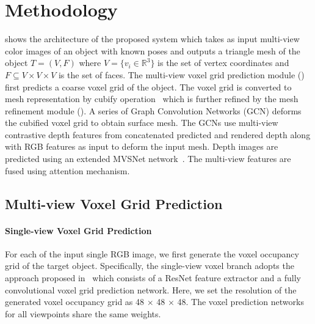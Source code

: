 \section{Methodology}
 shows the architecture of the proposed system which takes as input multi-view color images of an object with known poses and outputs a triangle mesh of the object $ T = (V, F) $ where $ V = \{ v_i \in \mathbb{R}^3\} $ is the set of vertex coordinates and $ F \subseteq V \times V \times V $ is the set of faces.
The multi-view voxel grid prediction module () first predicts a coarse voxel grid of the object.
The voxel grid is converted to mesh representation by cubify operation~\cite{gkioxari2019meshrcnn} which is further refined by the mesh refinement module ().
A series of Graph Convolution Networks (GCN) deforms the cubified voxel grid to obtain surface mesh.
The GCNs use multi-view contrastive depth features from concatenated predicted and rendered depth along with RGB features as input to deform the input mesh.
Depth images are predicted using an extended MVSNet network~\cite{yao2018mvsnet}.
The multi-view features are fused using attention mechanism.

\subsection{Multi-view Voxel Grid Prediction}
\label{subsec:multiview_voxel}

\paragraph{Single-view Voxel Grid Prediction}
For each of the input single RGB image, we first generate the voxel occupancy grid of the target object.
Specifically, the single-view voxel branch adopts the approach proposed in~\cite{gkioxari2019meshrcnn} which consists of a ResNet feature extractor and a fully convolutional voxel grid prediction network. 
Here, we set the resolution of the generated voxel occupancy grid as 48 $\times$ 48 $\times$ 48. 
The voxel prediction networks for all viewpoints share the same weights.

